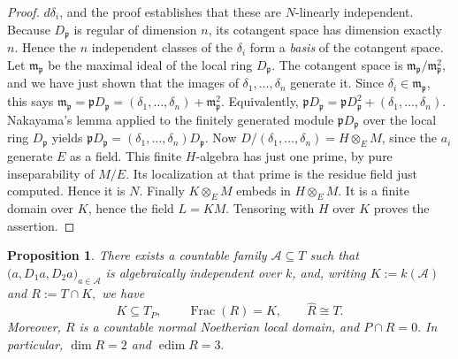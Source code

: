 \documentclass[11pt,a4paper]{amsart}
\numberwithin{equation}{section}
\newtheorem{proposition}[theorem]{Proposition}
\begin{document}
\begin{proof}
 \(d\delta_i\), and the proof establishes that these are
 \(N\)-linearly independent. Because \(D_{\mathfrak p}\) is regular of
dimension \(n\), its cotangent space has dimension exactly \(n\).
Hence the \(n\) independent classes of the \(\delta_i\) form a
\emph{basis} of the cotangent space.
Let \(\mathfrak m_{\mathfrak p}\) be the maximal ideal of the local ring
	\(D_{\mathfrak p}\). The cotangent space is
\(\mathfrak m_{\mathfrak p}/\mathfrak m_{\mathfrak p}^2\), and we have
just shown that the images of \(\delta_1,\dots,\delta_n\) generate it.
Since \(\delta_i\in\mathfrak m_{\mathfrak p}\), this says
$\mathfrak m_{\mathfrak p}=\mathfrak pD_{\mathfrak p}
=(\delta_1,\dots,\delta_n)+\mathfrak m_{\mathfrak p}^2 .$
Equivalently,
$\mathfrak pD_{\mathfrak p}
=\mathfrak pD_{\mathfrak p}^2+(\delta_1,\dots,\delta_n).$
Nakayama's lemma applied to the finitely generated module
\(\mathfrak pD_{\mathfrak p}\) over the local ring \(D_{\mathfrak p}\)
 	yields
$\mathfrak pD_{\mathfrak p}=(\delta_1,\ldots,\delta_n)D_{\mathfrak p}$.
Now $D/(\delta_1,\ldots,\delta_n)=H\otimes_E M$, since the $a_i$
generate $E$ as a field. This finite $H$-algebra has just one
prime, by pure inseparability of $M/E$. Its localization at that
prime is the residue field just computed. Hence it is $N$.
Finally $K\otimes_E M$ embeds in $H\otimes_E M$. It is a finite
	domain over $K$, hence the field $L=KM$. Tensoring with $H$
over $K$ proves the assertion.
 	\end{proof}
 	

















\begin{proposition}\label{prop:ring}
	There exists a countable family $\mathcal A\subseteq T$ such that
$\bigl(a,D_1a,D_2a\bigr)_{a\in\mathcal A}
	$
	is algebraically independent over $k$, 
	and, writing
$	K:=k(\mathcal A)$ and  $R:=T\cap K,$
	we have
	\[
	K\subseteq T_P,\qquad
	\operatorname{Frac}(R)=K,\qquad
	\widehat R\cong T.
	\]
	Moreover, $R$ is a countable normal Noetherian local domain,
	and
$P\cap R=0.$
	In particular,
$\dim R=2$ and $
	\operatorname{edim}R=3.$
\end{proposition}
\end{document}
